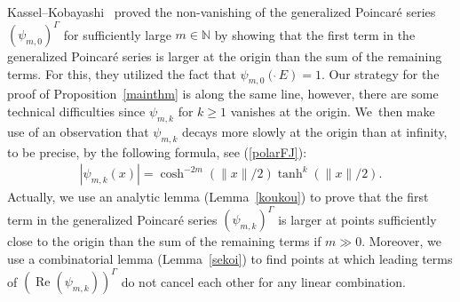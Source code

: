 \documentclass[pdftex]{sigma}
\numberwithin{equation}{section}
\begin{document}
Kassel--Kobayashi~\cite{KaKob16} proved the non-vanishing of
the generalized Poincar\'e series $(\psi_{m,0})^{\Gamma}$
for sufficiently large $m\in\mathbb{N}$
by showing that the first term in the generalized Poincar\'e series
is larger at the origin than the sum of the remaining terms.
For this, they utilized the fact that $\psi_{m,0}(\grave{\ }E)=1$.
Our strategy for the proof of Proposition~\ref{mainthm} is along the same line,
however, there are some technical difficulties
since $\psi_{m,k}$ for $k\geq1$ vanishes at the origin. We~then make use of an observation that
$\psi_{m,k}$ decays more slowly at the origin than at infinity,
to be precise, by the following formula, see (\ref{polarFJ}):
\begin{gather*}
|\psi_{m,k}(x)|=\cosh^{-2m}(\|x\|/2) \tanh^{k}(\|x\|/2).
\end{gather*}
Actually, we use an analytic lemma (Lemma~\ref{koukou})
to prove that the first term in the generalized Poincar\'e series $(\psi_{m,k})^{\Gamma}$
is larger at points sufficiently close to the origin
than the sum of the remaining terms if $m\gg0$.
Moreover,
we use a combinatorial lemma (Lemma~\ref{sekoi})
to find points at which
leading terms of
$(\operatorname{Re}(\psi_{m,k}))^{\Gamma}$
do not cancel each other for any linear combination.
\end{document}
